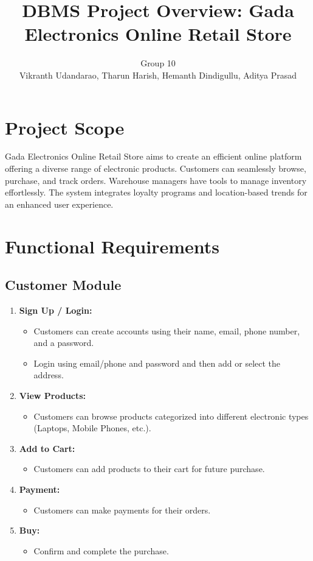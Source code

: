 \documentclass[12pt]{article}
\begin{document}
\title{\textbf{DBMS Project Overview: Gada Electronics Online Retail Store}}
\author{Group 10 \\ Vikranth Udandarao, Tharun Harish, Hemanth Dindigullu, Aditya Prasad}
\date{}
\maketitle

\section*{Project Scope}
Gada Electronics Online Retail Store aims to create an efficient online platform offering a diverse range of electronic products. Customers can seamlessly browse, purchase, and track orders. Warehouse managers have tools to manage inventory effortlessly. The system integrates loyalty programs and location-based trends for an enhanced user experience.

\section*{Functional Requirements}

\subsection*{Customer Module}
\begin{enumerate}[label=\arabic*.]
    \item \textbf{Sign Up / Login:}
          \begin{itemize}
              \item Customers can create accounts using their name, email, phone number, and a password.
              \item Login using email/phone and password and then add or select the address.
          \end{itemize}
    \item \textbf{View Products:}
          \begin{itemize}
              \item Customers can browse products categorized into different electronic types (Laptops, Mobile Phones, etc.).
          \end{itemize}
    \item \textbf{Add to Cart:}
          \begin{itemize}
              \item Customers can add products to their cart for future purchase.
          \end{itemize}
    \item \textbf{Payment:}
          \begin{itemize}
              \item Customers can make payments for their orders.
          \end{itemize}
    \item \textbf{Buy:}
          \begin{itemize}
              \item Confirm and complete the purchase.
          \end{itemize}
\end{enumerate}
\end{document}
